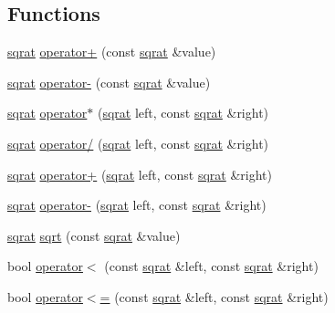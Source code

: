 \subsection*{Functions}
\begin{DoxyCompactItemize}
\item 
\mbox{\hyperlink{classsqrat}{sqrat}} \mbox{\hyperlink{adat-devel_2lib_2SU3_2sqrat_8cc_ab8dbbd752d091477f7adf5b7c5cd3670}{operator+}} (const \mbox{\hyperlink{classsqrat}{sqrat}} \&value)
\item 
\mbox{\hyperlink{classsqrat}{sqrat}} \mbox{\hyperlink{adat-devel_2lib_2SU3_2sqrat_8cc_a70316844998c6554d84ccbf8d5c00989}{operator-\/}} (const \mbox{\hyperlink{classsqrat}{sqrat}} \&value)
\item 
\mbox{\hyperlink{classsqrat}{sqrat}} \mbox{\hyperlink{adat-devel_2lib_2SU3_2sqrat_8cc_a5e48469d1ed26b50b4126de2e0af54ce}{operator$\ast$}} (\mbox{\hyperlink{classsqrat}{sqrat}} left, const \mbox{\hyperlink{classsqrat}{sqrat}} \&right)
\item 
\mbox{\hyperlink{classsqrat}{sqrat}} \mbox{\hyperlink{adat-devel_2lib_2SU3_2sqrat_8cc_aee702b38d8dbffa64a13f80ecef40f04}{operator/}} (\mbox{\hyperlink{classsqrat}{sqrat}} left, const \mbox{\hyperlink{classsqrat}{sqrat}} \&right)
\item 
\mbox{\hyperlink{classsqrat}{sqrat}} \mbox{\hyperlink{adat-devel_2lib_2SU3_2sqrat_8cc_a745e10823ca9fd448cd03c3be1f1060f}{operator+}} (\mbox{\hyperlink{classsqrat}{sqrat}} left, const \mbox{\hyperlink{classsqrat}{sqrat}} \&right)
\item 
\mbox{\hyperlink{classsqrat}{sqrat}} \mbox{\hyperlink{adat-devel_2lib_2SU3_2sqrat_8cc_a78ff1c6ccffbf6f100865af9030fddfb}{operator-\/}} (\mbox{\hyperlink{classsqrat}{sqrat}} left, const \mbox{\hyperlink{classsqrat}{sqrat}} \&right)
\item 
\mbox{\hyperlink{classsqrat}{sqrat}} \mbox{\hyperlink{adat-devel_2lib_2SU3_2sqrat_8cc_a4eaa086f75083f409944caa419ec9a8b}{sqrt}} (const \mbox{\hyperlink{classsqrat}{sqrat}} \&value)
\item 
bool \mbox{\hyperlink{adat-devel_2lib_2SU3_2sqrat_8cc_a24fed9cd6abdef03b0dc686180c99d15}{operator$<$}} (const \mbox{\hyperlink{classsqrat}{sqrat}} \&left, const \mbox{\hyperlink{classsqrat}{sqrat}} \&right)
\item 
bool \mbox{\hyperlink{adat-devel_2lib_2SU3_2sqrat_8cc_afeba3149c7e69a9a7feb8bf0c4021761}{operator$<$=}} (const \mbox{\hyperlink{classsqrat}{sqrat}} \&left, const \mbox{\hyperlink{classsqrat}{sqrat}} \&right)
\item 

\end{DoxyCompactItemize}
